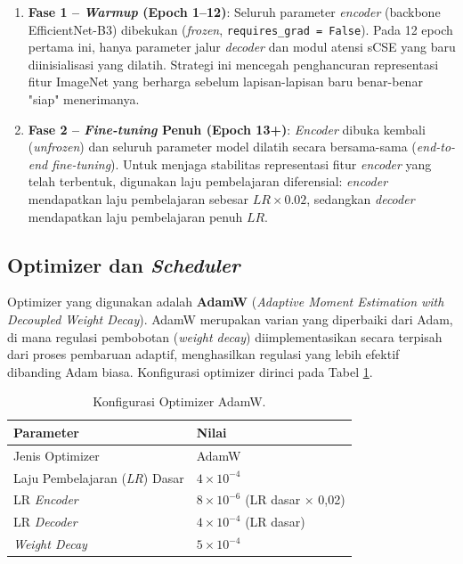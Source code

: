 \documentclass[12pt,a4paper,oneside]{book}
\begin{document}
\begin{enumerate}
  \item \textbf{Fase 1 -- \textit{Warmup} (Epoch 1--12)}: Seluruh parameter \textit{encoder} (backbone EfficientNet-B3) dibekukan (\textit{frozen}, \texttt{requires\_grad = False}). Pada 12 epoch pertama ini, hanya parameter jalur \textit{decoder} dan modul atensi sCSE yang baru diinisialisasi yang dilatih. Strategi ini mencegah penghancuran representasi fitur ImageNet yang berharga sebelum lapisan-lapisan baru benar-benar "siap" menerimanya.
  \item \textbf{Fase 2 -- \textit{Fine-tuning} Penuh (Epoch 13+)}: \textit{Encoder} dibuka kembali (\textit{unfrozen}) dan seluruh parameter model dilatih secara bersama-sama (\textit{end-to-end fine-tuning}). Untuk menjaga stabilitas representasi fitur \textit{encoder} yang telah terbentuk, digunakan laju pembelajaran diferensial: \textit{encoder} mendapatkan laju pembelajaran sebesar $\textit{LR} \times 0.02$, sedangkan \textit{decoder} mendapatkan laju pembelajaran penuh $\textit{LR}$.
\end{enumerate}

\subsection{Optimizer dan \textit{Scheduler}}

Optimizer yang digunakan adalah \textbf{AdamW} (\textit{Adaptive Moment Estimation with Decoupled Weight Decay}). AdamW merupakan varian yang diperbaiki dari Adam, di mana regulasi pembobotan (\textit{weight decay}) diimplementasikan secara terpisah dari proses pembaruan adaptif, menghasilkan regulasi yang lebih efektif dibanding Adam biasa. Konfigurasi optimizer dirinci pada Tabel \ref{tab:optimizer}.

\begin{table}[H]
  \centering
  \caption{Konfigurasi Optimizer AdamW.}
  \label{tab:optimizer}
  \begin{tabular}{l l}
    \toprule
    \textbf{Parameter} & \textbf{Nilai} \\
    \midrule
    Jenis Optimizer         & AdamW \\
    Laju Pembelajaran (\textit{LR}) Dasar & $4 \times 10^{-4}$ \\
    LR \textit{Encoder}     & $8 \times 10^{-6}$ (LR dasar $\times$ 0,02) \\
    LR \textit{Decoder}     & $4 \times 10^{-4}$ (LR dasar) \\
    \textit{Weight Decay}   & $5 \times 10^{-4}$ \\
    \bottomrule
  \end{tabular}
\end{table}
\end{document}
